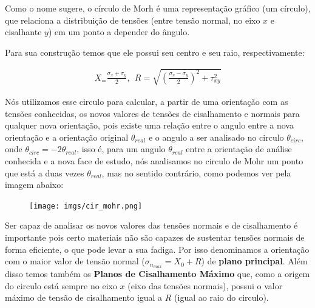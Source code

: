 \documentclass{article}
\begin{document}
Como o nome sugere, o círculo de Morh é uma representação gráfico (um círculo), que relaciona a distribuição de tensões (entre tensão normal, no eixo $x$ e cisalhante $y$) em um ponto a depender do ângulo. 

Para sua construção temos que ele possui seu centro e seu raio, respectivamente:

\begin{align}
    X_ = \frac{\sigma_x + \sigma_y}{2}, \ \ R = \sqrt{\left(\frac{\sigma_x - \sigma_y}{2}\right)^2 + \tau^2_{xy}}
    \label{eq:circulo_mohr}
\end{align}

Nós utilizamos esse circulo para calcular, a partir de uma orientação com as tensões conhecidas, os novos valores de tensões de cisalhamento e normais para qualquer nova orientação, pois existe uma relação entre o angulo entre a nova orientação e a orientação original $\theta_{real}$ e o angulo a ser analisado no circulo $\theta_{circ}$, onde $\theta_{circ} = -2\theta_{real}$, isso é, para um angulo $\theta_{real}$ entre a orientação de análise conhecida e a nova face de estudo, nós analisamos no circulo de Mohr um ponto que está a duas vezes $\theta_{real}$, mas no sentido contrário, como podemos ver pela imagem abaixo:


\begin{figure}[h]
    \centering
    \texttt{[image: imgs/cir\_mohr.png]}
\end{figure}

Ser capaz de analisar os novos valores das tensões normais e de cisalhamento é importante pois certo materiais não são capazes de sustentar tensões normais de forma eficiente, o que pode levar a sua fadiga. Por isso denominamos a orientação com o maior valor de tensão normal ($ \sigma_{n_{max}} = X_0 + R$) de \textbf{plano principal}. Além disso temos também os \textbf{Planos de Cisalhamento Máximo} que, como a origem do circulo está sempre no eixo $x$ (eixo das tensões normais), possui o valor máximo de tensão de cisalhamento igual a $R$ (igual ao raio do circulo).
\end{document}
